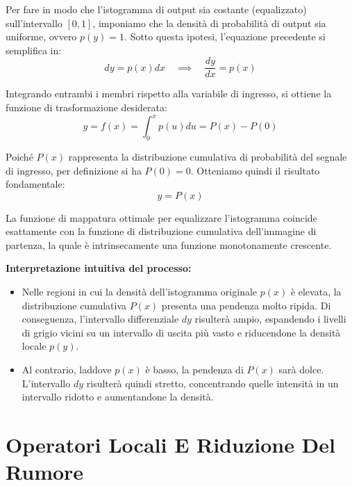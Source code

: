 ﻿\documentclass[11pt, a4paper]{article}
\begin{document}

Per fare in modo che l'istogramma di output sia costante (equalizzato) sull'intervallo $[0,1]$, imponiamo che la densità di probabilità di output sia uniforme, ovvero $p(y) = 1$. Sotto questa ipotesi, l'equazione precedente si semplifica in:
\[ dy = p(x)dx \quad \implies \quad \frac{dy}{dx} = p(x) \]

Integrando entrambi i membri rispetto alla variabile di ingresso, si ottiene la funzione di trasformazione desiderata:
\[ y = f(x) = \int_{0}^{x} p(u)du = P(x) - P(0) \]

Poiché $P(x)$ rappresenta la distribuzione cumulativa di probabilità del segnale di ingresso, per definizione si ha $P(0) = 0$. Otteniamo quindi il risultato fondamentale:
\[ \boxed{y = P(x)} \]

La funzione di mappatura ottimale per equalizzare l'istogramma coincide esattamente con la funzione di distribuzione cumulativa dell'immagine di partenza, la quale è intrinsecamente una funzione monotonamente crescente.

\textbf{Interpretazione intuitiva del processo:}
\begin{itemize}
    \item Nelle regioni in cui la densità dell'istogramma originale $p(x)$ è elevata, la distribuzione cumulativa $P(x)$ presenta una pendenza molto ripida. Di conseguenza, l'intervallo differenziale $dy$ risulterà ampio, espandendo i livelli di grigio vicini su un intervallo di uscita più vasto e riducendone la densità locale $p(y)$.
    \item Al contrario, laddove $p(x)$ è basso, la pendenza di $P(x)$ sarà dolce. L'intervallo $dy$ risulterà quindi stretto, concentrando quelle intensità in un intervallo ridotto e aumentandone la densità.
\end{itemize}


\newpage

\section{Operatori Locali E Riduzione Del Rumore}
\end{document}
